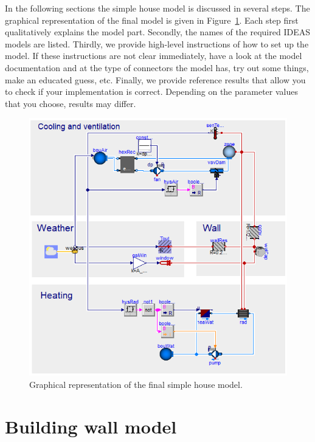 \documentclass[10pt,a4paper]{article}
\begin{document}
In the following sections the simple house model is discussed 
in several steps. The graphical representation of the final model is 
given in Figure~\ref{fig:simpleHouse}.
Each step first qualitatively explains the model part.
Secondly, the names of the required IDEAS models 
are listed.
Thirdly, we provide high-level instructions of how to
set up the model.
If these instructions are not clear immediately, 
have a look at the model documentation and at the type of
connectors the model has, 
try out some things, 
make an educated guess, etc.
Finally, we provide reference results that allow you to check
if your implementation is correct. 
Depending on the parameter values that you choose, results
may differ.

\newpage
 
\begin{figure}[h!]
\centering
\includegraphics[scale=0.8]{simpleHouse.png}
\caption{Graphical representation of the final simple house model.}
\label{fig:simpleHouse}
\end{figure}

\newpage

\section{Building wall model}
\end{document}
